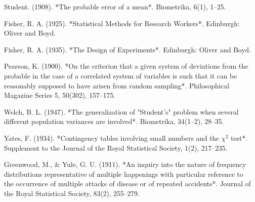 \documentclass{book}
\begin{document}
\begin{thebibliography}{999}
Student. (1908). *The probable error of a mean*.
Biometrika, 6(1), 1–25.

Fisher, R. A. (1925). *Statistical Methods for Research Workers*.
Edinburgh: Oliver and Boyd.

Fisher, R. A. (1935). *The Design of Experiments*.
Edinburgh: Oliver and Boyd.

Pearson, K. (1900). *On the criterion that a given system of deviations from the probable in the case of a correlated system of variables is such that it can be reasonably supposed to have arisen from random sampling*.
Philosophical Magazine Series 5, 50(302), 157–175.

Welch, B. L. (1947). *The generalization of "Student’s" problem when several different population variances are involved*. 
Biometrika, 34(1–2), 28–35.

Yates, F. (1934). *Contingency tables involving small numbers and the $\chi^2$ test*.
Supplement to the Journal of the Royal Statistical Society, 1(2), 217–235.

Greenwood, M., \& Yule, G. U. (1911). *An inquiry into the nature of frequency distributions representative of multiple happenings with particular reference to the occurrence of multiple attacks of disease or of repeated accidents*.
Journal of the Royal Statistical Society, 83(2), 255–279.

\end{thebibliography}
\end{document}
